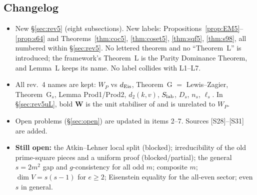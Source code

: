\subsection{Changelog}
\begin{itemize}[leftmargin=2em]
\item New \S\ref{sec:rev5} (eight subsections). New labels: Propositions~\ref{prop:EM5}--\ref{prop:s64} and Theorems~\ref{thm:coc5}, \ref{thm:coset5}, \ref{thm:sqf5}, \ref{thm:s98}, all numbered within \S\ref{sec:rev5}. No lettered theorem and no ``Theorem~L'' is introduced; the framework's Theorem~L is the Parity Dominance Theorem, and Lemma~L keeps its name. No label collides with L1--L7.
\item All rev.~4 names are kept: $W_P$ vs $d_{\rm Eis}$, Theorem~G $=$ Lewis--Zagier, Theorem~G$_s$, Lemma Prod1/Prod2, $d_2(k,v)$, $S_{\rm lab}$, $D_s$, $n_s$, $\ell_s$. In \S\ref{sec:rev5uL}, bold $\mathbf W$ is the unit stabiliser of  and is unrelated to $W_P$.
\item Open problems (\S\ref{sec:open}) are updated in items 2--7. Sources [S28]--[S31] are added.
\item \textbf{Still open:} the Atkin--Lehner local split (blocked); irreducibility of the old prime-square pieces and a uniform proof (blocked/partial); the general $s=2m^2$ gap and $g$-consistency for all odd $m$; composite $m$; $\dim V=s(s-1)$ for $e\ge2$; Eisenstein equality for the all-even sector; even $s$ in general.
\end{itemize}

